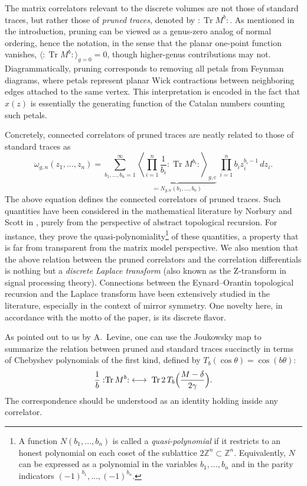 \documentclass[a4paper,11pt,english]{article}
\theoremstyle{plain}
\theoremstyle{definition}
\theoremstyle{plain}
\newcommand{\cc}{\mathrm{c}}
\DeclareMathOperator{\Tr}{Tr}
\newcommand{\normord}[1]{:\mathrel{#1}:}
\newcommand{\NTr}[1]{\normord{\Tr{#1}}}
\newcommand{\Z}{\mathbb{Z}}
\begin{document}
The matrix correlators relevant to the discrete volumes are not those of standard traces, but rather those of \emph{pruned traces}, denoted by $\NTr{M^b}$. As mentioned in the introduction, pruning can be viewed as a genus-zero analog of normal ordering, hence the notation, in the sense that the planar one-point function vanishes, $\langle \NTr{ M^{b} } \rangle_{g=0} = 0$, though higher-genus contributions may not. Diagrammatically, pruning corresponds to removing all petals from Feynman diagrams, where petals represent planar Wick contractions between neighboring edges attached to the same vertex. This interpretation is encoded in the fact that $x(z)$ is essentially the generating function of the Catalan numbers counting such petals.

Concretely, connected correlators of pruned traces are neatly related to those of standard traces as
\begin{equation}\label{eq:corr:TR}
     \omega_{g,n}(z_1,\ldots,z_n)
     =
     \sum_{b_{1},\ldots,b_n=1}^{\infty}
        \underbrace{\left\langle \prod_{i=1}^n \frac{1}{b_i} \NTr{ M^{b_i} } \right\rangle_{\!\!g,\cc}}_{\eqqcolon N_{g,n}(b_1,\ldots,b_n)} \
        \prod_{i=1}^n b_i z_i^{b_i-1} \, dz_{i} .
\end{equation}
The above equation defines the connected correlators of pruned traces. Such quantities have been considered in the mathematical literature by Norbury and Scott in \cite{NS13}, purely from the perspective of abstract topological recursion. For instance, they prove the quasi-polynomiality\footnote{
	A function $N(b_1,\dots,b_n)$ is called a \emph{quasi-polynomial} if it restricts to an honest polynomial on each coset of the sublattice $2\Z^n \subset \Z^n$. Equivalently, $N$ can be expressed as a polynomial in the variables $b_1,\dots,b_n$ and in the parity indicators $(-1)^{b_1},\dots,(-1)^{b_n}$.
} of these quantities, a property that is far from transparent from the matrix model perspective. We also mention that the above relation between the pruned correlators and the correlation differentials is nothing but a \emph{discrete Laplace transform} (also known as the Z-transform in signal processing theory). Connections between the Eynard--Orantin topological recursion and the Laplace transform have been extensively studied in the literature, especially in the context of mirror symmetry. One novelty here, in accordance with the motto of the paper, is its discrete flavor.

As pointed out to us by A.~Levine, one can use the Joukowsky map to summarize the relation between pruned and standard traces succinctly in terms of Chebyshev polynomials of the first kind, defined by $T_b(\cos\theta) = \cos(b\theta)$:
\begin{equation} \label{eq:prune:Cheby}
    \frac{1}{b}\NTr{ M^{b} }
    \;\longleftrightarrow\;
    \Tr 2\,T_{b}\Bigl( \frac{M - \delta}{2\gamma} \Bigr).
\end{equation}
The correspondence should be understood as an identity holding inside any correlator.
\end{document}

